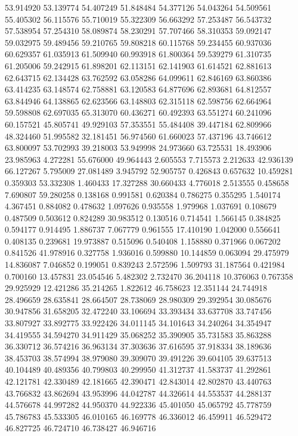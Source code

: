 53.914920
53.139774
54.407249
51.848484
54.377126
54.043264
54.509561
55.405302
56.115576
55.710019
55.322309
56.663292
57.253487
56.543732
57.538954
57.254310
58.089874
58.230291
57.707466
58.310353
59.092147
59.032975
59.489456
59.210765
59.808218
60.115768
59.234455
60.937036
60.629357
61.035913
61.509940
60.993918
61.800364
59.539279
61.310735
61.205006
59.242915
61.898201
62.113151
62.141903
61.614521
62.881613
62.643715
62.134428
63.762592
63.058286
64.099611
62.846169
63.860386
63.414235
63.148574
62.758881
63.120583
64.877696
62.893681
64.812557
63.844946
64.138865
62.623566
63.148803
62.315118
62.598756
62.664964
59.598808
62.697035
65.313070
60.436271
60.492393
63.551274
60.241096
60.157521
45.805741
49.929103
57.353551
55.484408
39.447184
62.809966
48.324460
51.995582
32.181451
56.974560
61.660023
57.437196
43.746612
63.800097
53.702993
39.218003
53.949998
24.973660
63.725531
18.493906
23.985963
4.272281
55.676000
49.964443
2.605553
7.715573
2.212633
42.936139
66.127267
5.795009
27.081489
3.945792
52.905757
0.426843
0.657632
10.459281
0.359303
53.332308
1.460433
17.327288
30.660433
4.776018
2.513555
0.458658
7.690807
59.280258
0.138168
0.991581
0.620384
0.786275
0.355295
1.540174
4.367451
0.884082
0.478632
1.097626
0.935558
1.979968
1.037691
0.108679
0.487509
0.503612
0.824289
30.983512
0.130516
0.714541
1.566145
0.384825
0.594177
0.914495
1.886737
7.067779
0.961555
17.410190
1.042000
0.556641
0.408135
0.239681
19.973887
0.515096
0.540408
1.158880
0.371966
0.067202
0.841526
41.978916
0.327758
1.936016
0.599880
10.144859
0.063094
29.475979
14.836087
7.046852
0.199051
0.839243
2.572596
1.509793
31.187564
0.421984
0.700160
13.457831
23.054546
5.482302
2.732470
36.204118
10.376063
0.767358
29.925929
12.421286
35.214265
1.822612
46.758623
12.351144
24.744918
28.496659
28.635841
28.664507
28.738069
28.980309
29.392954
30.085676
30.947856
31.658205
32.472240
33.106694
33.393434
33.637708
33.747456
33.807927
33.892775
33.922426
34.011145
34.101643
34.240264
34.354947
34.419555
34.594270
34.911429
35.068252
35.390905
35.731583
35.863288
36.330712
36.574216
36.963134
37.303636
37.616595
37.918334
38.189636
38.453703
38.574994
38.979080
39.309070
39.491226
39.604105
39.637513
40.104489
40.489356
40.799803
40.299950
41.312737
41.583737
41.292861
42.121781
42.330489
42.181665
42.390471
42.843014
42.802870
43.440763
43.766832
43.862694
43.953996
44.042787
44.326614
44.553537
44.288137
44.576678
44.997282
44.950370
44.922336
45.401050
45.065792
45.778759
45.786783
45.533305
46.010165
46.169778
46.336012
46.459911
46.529472
46.827725
46.724710
46.738427
46.946716
